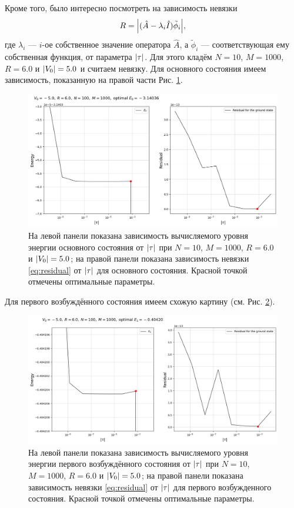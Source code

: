 \documentclass[11pt]{article}
\begin{document}
Кроме того, было интересно посмотреть на зависимость невязки
\begin{equation}
 R = \abs{(\hat A - \lambda_i \hat I) \tilde \phi_i},
 \label{eq:residual}
\end{equation}
где $\lambda_i$ --- $i$-ое собственное значение оператора $\hat A$, а $ \tilde \phi_i$ --- соответствующая ему собственная функция, от параметра $\abs{\tau}$. Для этого кладём $N=10$, $M=1000$, $R=6.0$ и $\abs{V_0}=5.0$ и считаем невязку. Для основного состояния имеем зависимость, показанную на правой части Рис. \ref{fig:E_vs_tau_-5.0_e0}.
\begin{figure}[htbp]
    \centering
    \includegraphics[width=\textwidth]{../figures/E_vs_tau_-5.0_e0}
    \caption{На левой панели показана зависимость вычисляемого уровня энергии основного состояния от $\abs{\tau}$ при  $N=10$, $M=1000$, $R=6.0$ и $\abs{V_0}=5.0$; на правой панели показана зависимость невязки \eqref{eq:residual} от $\abs{\tau}$ для основного состояния. Красной точкой отмечены оптимальные параметры.}
    \label{fig:E_vs_tau_-5.0_e0}
\end{figure}
Для первого возбуждённого состояния имеем схожую картину (см. Рис. \ref{fig:E_vs_tau_-5.0_e1}).
\begin{figure}[htbp]
    \centering
    \includegraphics[width=\textwidth]{../figures/E_vs_tau_-5.0_e1}
    \caption{На левой панели показана зависимость вычисляемого уровня энергии первого возбуждённого состояния от $\abs{\tau}$ при  $N=10$, $M=1000$, $R=6.0$ и $\abs{V_0}=5.0$; на правой панели показана зависимость невязки \eqref{eq:residual} от $\abs{\tau}$ для первого возбужденного состояния. Красной точкой отмечены оптимальные параметры.}
    \label{fig:E_vs_tau_-5.0_e1}
\end{figure}
\end{document}
